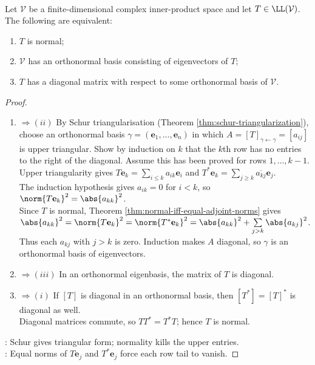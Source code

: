 \begin{theorem} \label{thm:complex-spectral-theorem} \\
Let $\mathcal{V}$ be a finite-dimensional complex inner-product space and let $T\in\LL(\mathcal{V})$. The following are equivalent:
\begin{enumerate}[label=\roman*.]
\setlength{\itemsep}{0pt}
\item $T$ is normal;
\item $\mathcal{V}$ has an orthonormal basis consisting of eigenvectors of $T$;
\item $T$ has a diagonal matrix with respect to some orthonormal basis of $\mathcal{V}$.
\end{enumerate}
\begin{proof}
\begin{enumerate}[label=(\roman*).]
\setlength{\itemsep}{0pt}
\item[$(i)$]$\Rightarrow(ii)$
By Schur triangularisation (Theorem \ref{thm:schur-triangularization}), choose an orthonormal basis $\gamma=(\mathbf{e}_1,\ldots,\mathbf{e}_n)$ in which $A=[T]_{\gamma\leftarrow\gamma}=[a_{ij}]$ is upper triangular. Show by induction on $k$ that the $k$th row has no entries to the right of the diagonal. Assume this has been proved for rows $1,\ldots,k-1$.\\
Upper triangularity gives $T\mathbf{e}_k=\sum\limits_{i\leq k}a_{ik}\mathbf{e}_i$ and $T^*\mathbf{e}_k=\sum\limits_{j\geq k}\overline{a_{kj}}\mathbf{e}_j$.\\
The induction hypothesis gives $a_{ik}=0$ for $i<k$, so $\norm{T\mathbf{e}_k}^2=\abs{a_{kk}}^2$.\\
Since $T$ is normal, Theorem \ref{thm:normal-iff-equal-adjoint-norms} gives $\abs{a_{kk}}^2 =\norm{T\mathbf{e}_k}^2 =\norm{T^*\mathbf{e}_k}^2 =\abs{a_{kk}}^2+\sum\limits_{j>k}\abs{a_{kj}}^2$.\\
Thus each $a_{kj}$ with $j>k$ is zero. Induction makes $A$ diagonal, so $\gamma$ is an orthonormal basis of eigenvectors.
\item[$(ii)$]$\Rightarrow(iii)$
In an orthonormal eigenbasis, the matrix of $T$ is diagonal.
\item[$(iii)$]$\Rightarrow(i)$
If $[T]$ is diagonal in an orthonormal basis, then $[T^*]=[T]^*$ is diagonal as well.\\
Diagonal matrices commute, so $TT^*=T^*T$; hence $T$ is normal.
\end{enumerate}
: Schur gives triangular form; normality kills the upper entries.\\
: Equal norms of $T\mathbf{e}_j$ and $T^*\mathbf{e}_j$ force each row tail to vanish.
\end{proof}
\end{theorem}

